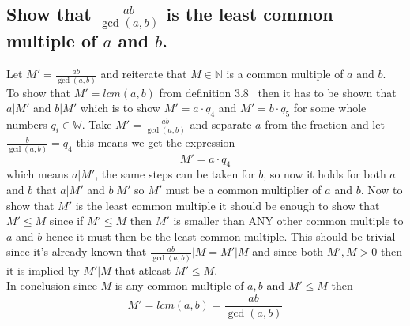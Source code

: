 \documentclass[12pt]{article}
\begin{document}
\subsection*{Show that $\frac{ab}{\gcd(a,b)}$ is the least common multiple of $a$ and $b$.}
Let $M' = \frac{ab}{\gcd(a,b)}$ and reiterate that $M \in \mathbb{N}$ is a common multiple of $a$ and $b$.\\
To show that $M' = lcm(a,b)$ from definition 3.8~\cite{Algebra} then it has to be shown that $a|M'$ and $b|M'$ which is to show $M' = a \cdot q_4$ and $M' = b \cdot q_5$ for some whole numbers $q_i \in \mathbb{W}$.
\newline
Take $M' = \frac{ab}{\gcd(a,b)}$ and separate $a$ from the fraction and let $\frac{b}{\gcd(a,b)} = q_4$  this means we get the expression
\[
M' = a \cdot q_4
\]
which means $a|M'$, the same steps can be taken for $b$, so now it holds for both $a$ and $b$ that $a|M'$ and $b|M'$ so $M'$ must be a common multiplier of $a$ and $b$.
\newline
Now to show that $M'$ is the least common multiple it should be enough to show that $M' \leq M$ since if $M' \leq M$ then $M'$ is smaller than ANY other common multiple to $a$ and $b$ hence it must then be the least common multiple.
\newline
This should be trivial since it's already known that $\frac{ab}{\gcd(a,b)}|M = M'|M$ and since both $M',M > 0$ then it is implied by $M'|M$ that atleast $M' \leq M$.\\
\newline
In conclusion since $M$ is any common multiple of $a,b$ and $M' \leq M$ then
\[
M' = lcm(a,b) = \frac{ab}{\gcd(a,b)}
\] 
\printbibliography
\end{document}
